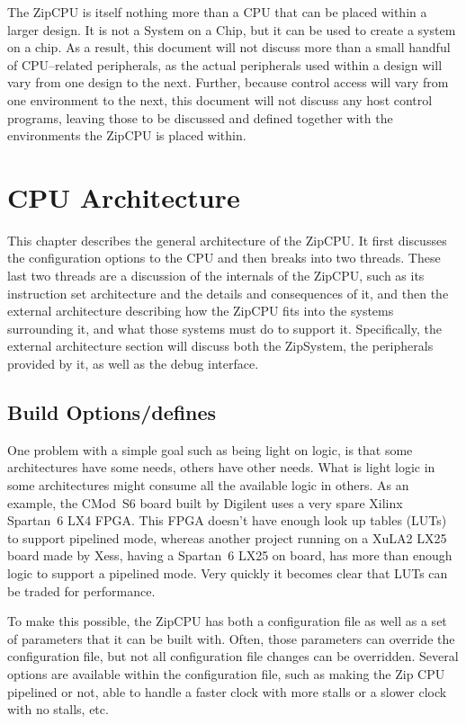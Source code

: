 \documentclass{gqtekspec}
\begin{document}
The ZipCPU is itself nothing more than a CPU that can be placed within a 
larger design.  It is not a System on a Chip, but it can be used to create
a system on a chip.  As a result, this document will not discuss more than a
small handful of CPU--related peripherals, as the actual peripherals used
within a design will vary from one design to the next.  Further, because
control access will vary from one environment to the next, this document will
not discuss any host control programs, leaving those to be discussed and defined
together with the environments the ZipCPU is placed within.

\chapter{CPU Architecture}\label{chap:arch}

This chapter describes the general architecture of the ZipCPU.  It first
discusses
the configuration options to the CPU and then breaks into two threads. These
last two threads are a discussion of the internals of the ZipCPU, such as its 
instruction set architecture and the details and consequences of it, and then
the external architecture describing how the ZipCPU fits into the systems
surrounding it, and what those systems must do to support it.  Specifically,
the external architecture section will discuss both the ZipSystem, the
peripherals provided by it, as well as the debug interface.

\section{Build Options/defines}\label{ssec:build-options}

One problem with a simple goal such as being light on logic, is that some
architectures have some needs, others have other needs.  What is light logic
in some architectures might consume all the available logic in others.
As an example, the CMod~S6 board built by Digilent uses a very spare Xilinx
Spartan~6 LX4 FPGA.  This FPGA doesn't have enough look up tables (LUTs) to
support pipelined mode, whereas another project running on a XuLA2 LX25 board
made by Xess, having a Spartan~6 LX25 on board, has more than enough logic
to support a pipelined mode.   Very quickly it becomes clear that LUTs can be
traded for performance.

To make this possible, the ZipCPU has both a configuration file as well as a
set of parameters that it can be built with.  Often, those parameters can
override the configuration file, but not all configuration file changes can
be overridden.  Several options are available within the configuration file,
such as making the Zip CPU pipelined or not, able to handle a faster clock
with more stalls or a slower clock with no stalls, etc.
\end{document}

